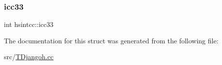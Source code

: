 \mbox{\label{structhsintcc_a16234e4e8e5c229cbb3abbba3da47efc}} 
\subsubsection{\texorpdfstring{icc33}{icc33}}
{\footnotesize\ttfamily int hsintcc\+::icc33}



The documentation for this struct was generated from the following file\+:\begin{DoxyCompactItemize}
\item 
src/\hyperlink{_t_djangoh_8cc}{T\+Djangoh.\+cc}\end{DoxyCompactItemize}
